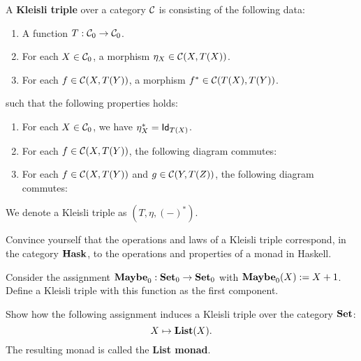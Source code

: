 \begin{dfn}\label{def:kleisli-triple}
  A \textbf{Kleisli triple} over a category $\CC$ is  consisting of the following data:
\begin{enumerate}
\item A function $T: \Ob{\CC}\to \Ob{\CC}$.
\item For each $X\in\Ob{\CC}$, a morphism $\eta_X \in \CHom{\CC}{X}{T(X)}$.
\item For each $f\in\CHom{\CC}{X}{T(Y)}$, a morphism $f^{*} \in \CHom{\CC}{T(X)}{T(Y)}$.
\end{enumerate}
such that the following properties holds:
\begin{enumerate}[resume]
\item For each $X \in \Ob\CC$, we have $\eta_X^{*} = \Id[T(X)]$.
\item For each $f\in\CHom{\CC}{X}{T(Y)}$, the following diagram commutes:
\begin{center}
\end{center}
\item For each $f\in\CHom{\CC}{X}{T(Y)}$ and $g\in\CHom{\CC}{Y}{T(Z)}$, the following diagram commutes:
\begin{center}
\end{center}
\end{enumerate}
We denote a Kleisli triple as $(T,\eta, (-)^{*})$.
\end{dfn}

\begin{exer}
  Convince yourself that the operations and laws of a Kleisli triple correspond, in the category $\HASK$, to the operations and properties of a monad in Haskell.
\end{exer}

\begin{exer}
  Consider the assignment $\Ob{\Maybe} : \Ob{\SET}\to \Ob{\SET}$ with $\Ob{\Maybe}(X) := X + 1$.
  Define a Kleisli triple with this function as the first component.
\end{exer}

\begin{exer}\label{exer:kleisli_triple_list} Show how the following assignment induces a Kleisli triple over the category $\SET$:
\[
X\mapsto \List(X).
\]
The resulting monad is called the \textbf{List monad}.
\end{exer}

